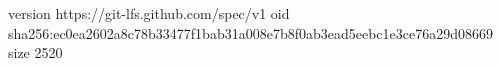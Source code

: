 version https://git-lfs.github.com/spec/v1
oid sha256:ec0ea2602a8c78b33477f1bab31a008e7b8f0ab3ead5eebc1e3ce76a29d08669
size 2520
